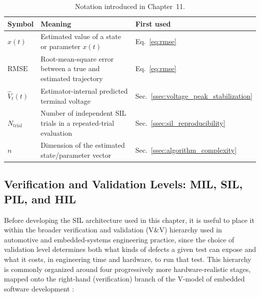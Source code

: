 \begin{table}[htbp]
	\centering
	\caption{Notation introduced in Chapter~11.}
	\label{tab:ch11_notation}
	\begin{tabular}{p{2.2cm}p{7.2cm}p{2.4cm}}
		\toprule
		Symbol & Meaning & First used \\
		\midrule
		$\hat{x}(t)$ & Estimated value of a state or parameter $x(t)$ & Eq.~\eqref{eq:rmse} \\
		$\mathrm{RMSE}$ & Root-mean-square error between a true and estimated trajectory & Eq.~\eqref{eq:rmse} \\
		$\hat{V}_t(t)$ & Estimator-internal predicted terminal voltage & Sec.~\ref{ssec:voltage_peak_stabilization} \\
		$N_{\text{trial}}$ & Number of independent SIL trials in a repeated-trial evaluation & Sec.~\ref{ssec:sil_reproducibility} \\
		$n$ & Dimension of the estimated state/parameter vector & Sec.~\ref{ssec:algorithm_complexity} \\
		\bottomrule
	\end{tabular}
\end{table}

\subsection{Verification and Validation Levels: MIL, SIL, PIL, and HIL}
\label{ssec:xil_taxonomy}

Before developing the SIL architecture used in this chapter, it is useful to place it within the broader verification and validation (V\&V) hierarchy used in automotive and embedded-systems engineering practice, since the choice of validation level determines both what kinds of defects a given test can expose and what it costs, in engineering time and hardware, to run that test. This hierarchy is commonly organized around four progressively more hardware-realistic stages, mapped onto the right-hand (verification) branch of the V-model of embedded software development \cite{patsnap_hil_sil}:

